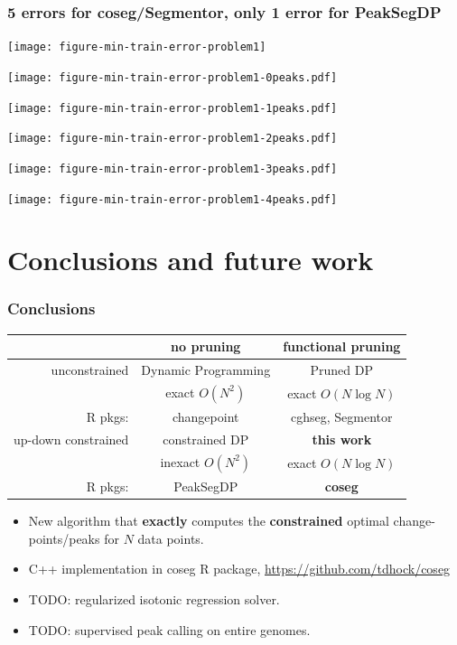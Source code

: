 \documentclass{beamer}
\begin{document}
\begin{frame}
  \frametitle{5 errors for coseg/Segmentor, only 1 error for PeakSegDP}
  \texttt{[image: figure-min-train-error-problem1]}
\end{frame}


\begin{frame}
  \texttt{[image: figure-min-train-error-problem1-0peaks.pdf]}
\end{frame}

\begin{frame}
  \texttt{[image: figure-min-train-error-problem1-1peaks.pdf]}
\end{frame}

\begin{frame}
  \texttt{[image: figure-min-train-error-problem1-2peaks.pdf]}
\end{frame}

\begin{frame}
  \texttt{[image: figure-min-train-error-problem1-3peaks.pdf]}
\end{frame}

\begin{frame}
  \texttt{[image: figure-min-train-error-problem1-4peaks.pdf]}
\end{frame}

\section{Conclusions and future work}

\begin{frame}
  \frametitle{Conclusions}
  \begin{tabular}{r|c|c}
    & no pruning & functional pruning \\
    \hline
    unconstrained & Dynamic Programming & Pruned DP \\
     & exact $O(N^2)$ & exact $O(N\log N)$\\
    R pkgs: & changepoint & cghseg, Segmentor\\
    \hline
    up-down constrained & constrained DP & \textbf{this work} \\
     & inexact $O(N^2)$ & exact $O(N\log N)$\\
    R pkgs: & PeakSegDP & \textbf{coseg}\\
    \hline
  \end{tabular}
  \begin{itemize}
  \item New algorithm that \textbf{exactly} computes the
    \textbf{constrained} optimal change-points/peaks for $N$ data points.
  \item C++ implementation in coseg R package, 
    \url{https://github.com/tdhock/coseg}
  \item TODO: regularized isotonic regression solver.
  \item TODO: supervised peak calling on entire genomes.
  \end{itemize}
\end{frame}
\end{document}
